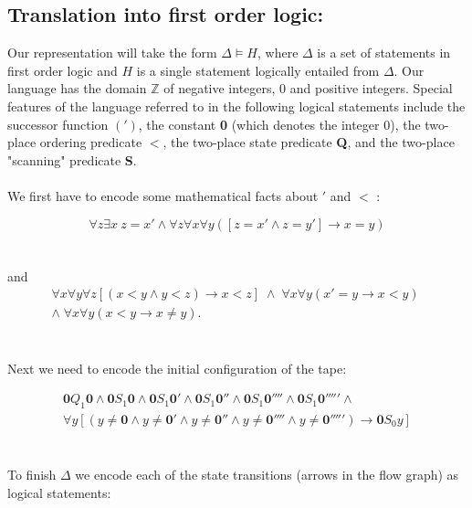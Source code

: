 \documentclass[a4paper,11pt]{article}
\begin{document}
\bigskip

\subsection*{Translation into first order logic:}

\bigskip

Our representation will take the form $\Delta \models H$, where $\Delta$ is a set of statements in 
first order logic and $H$ is a single statement logically entailed from $\Delta$. Our language has 
the domain $\mathbb{Z}$ of negative integers, 0 and positive integers. Special features of the language
referred to in the following logical statements include the successor function $(')$, the constant \textbf{0}
(which denotes the integer 0), the two-place ordering predicate $<$, the two-place state predicate \textbf{Q}, 
and the two-place "scanning" predicate \textbf{S}.
\\\\
We first have to encode some mathematical facts about $'$ and $<$ :

\begin{equation}
\forall z \exists x \: z=x' \land \forall z \forall x \forall y ([z=x' \land z=y'] \rightarrow x = y) 
\end{equation}	
\\\\
and
\begin{multline}
\forall x \forall y \forall z [(x<y \land y<z) \rightarrow x<z] \; \land \; \forall x \forall y (x'=y \rightarrow x<y) 
\; \\ \land \; \forall x \forall y (x<y \rightarrow x \neq y).
\end{multline}
\\\\
Next we need to encode the initial configuration of the tape:


\begin{multline}
\textbf{0} Q_{1} \textbf{0} \land \textbf{0} S_{1} \textbf{0} \land \textbf{0} S_{1} \textbf{0}' \land
\textbf{0} S_{1} \textbf{0}'' \land \textbf{0} S_{1} \textbf{0}'''' \land \textbf{0} S_{1} \textbf{0}''''' \land \\
\forall y [(y \neq \textbf{0} \land y \neq \textbf{0}' \land y \neq \textbf{0}'' \land y \neq \textbf{0}'''' 
\land y \neq \textbf{0}''''') \rightarrow \textbf{0}S_{0}y]
\end{multline}
\\\\
To finish $\Delta$ we encode each of the state transitions (arrows in the flow graph) as logical statements:
\end{document}
